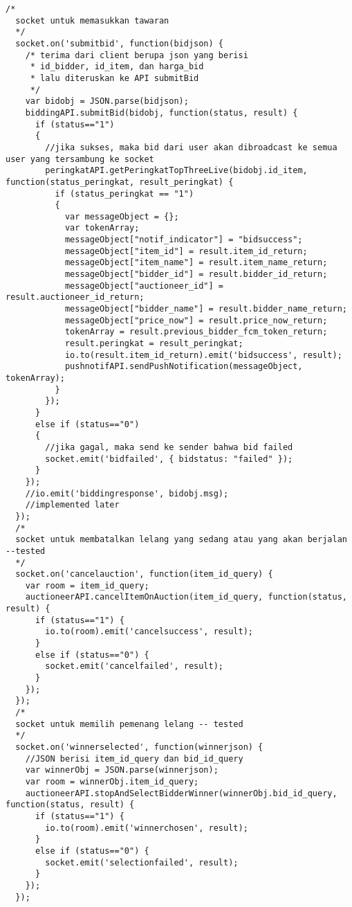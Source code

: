 \begin{lstlisting}[label=sc-socket-bid,style=htmlcssjs,caption=Kode Sumber Implementasi Node.js + Socket.io untuk Lelang]
  /*
  socket untuk memasukkan tawaran
  */
  socket.on('submitbid', function(bidjson) {
    /* terima dari client berupa json yang berisi
     * id_bidder, id_item, dan harga_bid
     * lalu diteruskan ke API submitBid
     */
    var bidobj = JSON.parse(bidjson);
    biddingAPI.submitBid(bidobj, function(status, result) {
      if (status=="1")
      {
        //jika sukses, maka bid dari user akan dibroadcast ke semua user yang tersambung ke socket
        peringkatAPI.getPeringkatTopThreeLive(bidobj.id_item, function(status_peringkat, result_peringkat) {
          if (status_peringkat == "1")
          {
            var messageObject = {};
            var tokenArray;
            messageObject["notif_indicator"] = "bidsuccess";
            messageObject["item_id"] = result.item_id_return;
            messageObject["item_name"] = result.item_name_return;
            messageObject["bidder_id"] = result.bidder_id_return;
            messageObject["auctioneer_id"] = result.auctioneer_id_return;
            messageObject["bidder_name"] = result.bidder_name_return;
            messageObject["price_now"] = result.price_now_return;
            tokenArray = result.previous_bidder_fcm_token_return;
            result.peringkat = result_peringkat;
            io.to(result.item_id_return).emit('bidsuccess', result);
            pushnotifAPI.sendPushNotification(messageObject, tokenArray);
          }
        });
      }
      else if (status=="0")
      {
        //jika gagal, maka send ke sender bahwa bid failed
        socket.emit('bidfailed', { bidstatus: "failed" });
      }
    });
    //io.emit('biddingresponse', bidobj.msg);
    //implemented later
  });
  /*
  socket untuk membatalkan lelang yang sedang atau yang akan berjalan --tested
  */
  socket.on('cancelauction', function(item_id_query) {
    var room = item_id_query;
    auctioneerAPI.cancelItemOnAuction(item_id_query, function(status, result) {
      if (status=="1") {
        io.to(room).emit('cancelsuccess', result);
      }
      else if (status=="0") {
        socket.emit('cancelfailed', result);
      }
    });
  });
  /*
  socket untuk memilih pemenang lelang -- tested
  */
  socket.on('winnerselected', function(winnerjson) {
    //JSON berisi item_id_query dan bid_id_query
    var winnerObj = JSON.parse(winnerjson);
    var room = winnerObj.item_id_query;
    auctioneerAPI.stopAndSelectBidderWinner(winnerObj.bid_id_query, function(status, result) {
      if (status=="1") {
        io.to(room).emit('winnerchosen', result);
      }
      else if (status=="0") {
        socket.emit('selectionfailed', result);
      }
    });
  });


\end{lstlisting}
